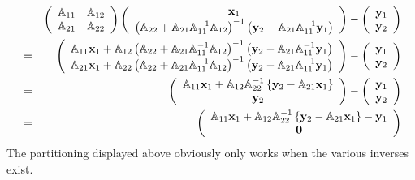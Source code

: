 \begin{eqnarray}
&&\left( 
\begin{array}{cc}
{\Bbb A}_{11} & {\Bbb A}_{12} \\ 
{\Bbb A}_{21} & {\Bbb A}_{22}%
\end{array}%
\right) \left( 
\begin{array}{c}
{\bf x}_{1} \\ 
\left( {\Bbb A}_{22}+{\Bbb A}_{21}{\Bbb A}_{11}^{-1}{\Bbb A}_{12}\right)
^{-1}\left( {\bf y}_{2}-{\Bbb A}_{21}{\Bbb A}_{11}^{-1}{\bf y}_{1}\right)%
\end{array}%
\right) -\left( 
\begin{array}{c}
{\bf y}_{1} \\ 
{\bf y}_{2}%
\end{array}%
\right)  \nonumber \\
&=&\left( 
\begin{array}{c}
{\Bbb A}_{11}{\bf x}_{1}+{\Bbb A}_{12}\left( {\Bbb A}_{22}+{\Bbb A}_{21}%
{\Bbb A}_{11}^{-1}{\Bbb A}_{12}\right) ^{-1}\left( {\bf y}_{2}-{\Bbb A}_{21}%
{\Bbb A}_{11}^{-1}{\bf y}_{1}\right) \\ 
{\Bbb A}_{21}{\bf x}_{1}+{\Bbb A}_{22}\left( {\Bbb A}_{22}+{\Bbb A}_{21}%
{\Bbb A}_{11}^{-1}{\Bbb A}_{12}\right) ^{-1}\left( {\bf y}_{2}-{\Bbb A}_{21}%
{\Bbb A}_{11}^{-1}{\bf y}_{1}\right)%
\end{array}%
\right) -\left( 
\begin{array}{c}
{\bf y}_{1} \\ 
{\bf y}_{2}%
\end{array}%
\right)  \nonumber \\
&=&\left( 
\begin{array}{c}
{\Bbb A}_{11}{\bf x}_{1}+{\Bbb A}_{12}{\Bbb A}_{22}^{-1}\left\{ {\bf y}_{2}-%
{\Bbb A}_{21}{\bf x}_{1}\right\} \\ 
{\bf y}_{2}%
\end{array}%
\right) -\left( 
\begin{array}{c}
{\bf y}_{1} \\ 
{\bf y}_{2}%
\end{array}%
\right)  \nonumber \\
&=&\left( 
\begin{array}{c}
{\Bbb A}_{11}{\bf x}_{1}+{\Bbb A}_{12}{\Bbb A}_{22}^{-1}\left\{ {\bf y}_{2}-%
{\Bbb A}_{21}{\bf x}_{1}\right\} -{\bf y}_{1} \\ 
{\bf 0}%
\end{array}%
\right)  \label{baksub2}
\end{eqnarray}%
The partitioning displayed above obviously only works when the various
inverses exist.

